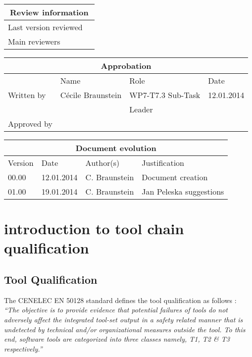 \documentclass{openetcs_report}
\begin{document}
\begin{tabular}{|p{4.4cm}|p{8.7cm}|}
\hline
\multicolumn{2}{|c|}{Review information} \\
\hline
Last version reviewed &  \\
\hline
Main reviewers &  \\
\hline
\end{tabular}

\begin{tabular}{|p{2.2cm}|p{4cm}|p{4cm}|p{2cm}|}
\hline
\multicolumn{4}{|c|}{Approbation} \\
\hline
  &  Name & Role & Date   \\
\hline  
Written by    &  Cécile Braunstein & WP7-T7.3 Sub-Task  & 12.01.2014 \\
&  & Leader&\\
\hline
Approved by &  &   &  \\
\hline
\end{tabular}

\begin{tabular}{|p{2.2cm}|p{2cm}|p{3cm}|p{5cm}|}
\hline
\multicolumn{4}{|c|}{Document evolution} \\
\hline
Version &  Date & Author(s) & Justification  \\
\hline  
00.00 & 12.01.2014 & C. Braunstein  &  Document creation  \\
01.00 & 19.01.2014 & C. Braunstein  &  Jan Peleska suggestions \\


\hline  
\end{tabular}
\newpage


\mainmatter







\chapter{introduction to tool chain qualification}
\label{chap-1}
\section{Tool Qualification}
\label{sec-1-1}


The CENELEC EN 50128 standard \cite{standard_railway_2011} defines the tool
qualification as follows :\\
{\it ``The objective is to provide evidence that potential
failures of tools do not adversely affect the integrated tool-set output in a
safety related manner that is undetected by technical and/or organizational
measures outside the tool. To this end, software tools are categorized into
three classes namely, T1, T2 \& T3 respectively.''}
\end{document}
